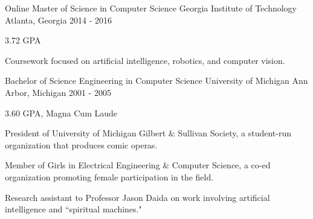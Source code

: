 


\begin{cventries}


\cventry
{Online Master of Science in Computer Science} %
{Georgia Institute of Technology} %
{Atlanta, Georgia} %
{2014 - 2016} %
{ %
\begin{cvitems}
\item {3.72 GPA}
\item {Coursework focused on artificial intelligence, robotics, and computer vision.}
\end{cvitems}
}


\cventry
{Bachelor of Science Engineering in Computer Science} %
{University of Michigan} %
{Ann Arbor, Michigan} %
{2001 - 2005} %
{ %
\begin{cvitems}
\item {3.60 GPA, Magna Cum Laude}
\item {President of University of Michigan Gilbert \& Sullivan Society, a student-run organization that produces comic operas.}
\item {Member of Girls in Electrical Engineering \& Computer Science, a co-ed organization promoting female participation in the field.}
\item {Research assistant to Professor Jason Daida on work involving artificial intelligence and ``spiritual machines."}
\end{cvitems}
}


\end{cventries}